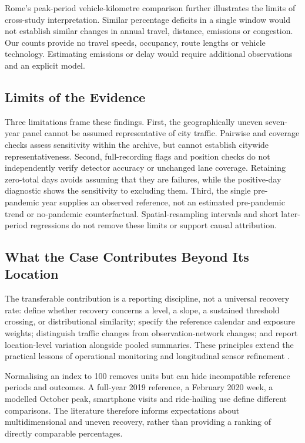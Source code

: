 \documentclass[]{interact}
\begin{document}
Rome's peak-period vehicle-kilometre comparison \cite{aletta2022} further illustrates the limits of cross-study interpretation. Similar percentage deficits in a single window would not establish similar changes in annual travel, distance, emissions or congestion. Our counts provide no travel speeds, occupancy, route lengths or vehicle technology. Estimating emissions or delay would require additional observations and an explicit model.

\subsection{Limits of the Evidence}
Three limitations frame these findings. First, the geographically uneven seven-year panel cannot be assumed representative of city traffic. Pairwise and coverage checks assess sensitivity within the archive, but cannot establish citywide representativeness. Second, full-recording flags and position checks do not independently verify detector accuracy or unchanged lane coverage. Retaining zero-total days avoids assuming that they are failures, while the positive-day diagnostic shows the sensitivity to excluding them. Third, the single pre-pandemic year supplies an observed reference, not an estimated pre-pandemic trend or no-pandemic counterfactual. Spatial-resampling intervals and short later-period regressions do not remove these limits or support causal attribution.

\subsection{What the Case Contributes Beyond Its Location}
The transferable contribution is a reporting discipline, not a universal recovery rate: define whether recovery concerns a level, a slope, a sustained threshold crossing, or distributional similarity; specify the reference calendar and exposure weights; distinguish traffic changes from observation-network changes; and report location-level variation alongside pooled summaries. These principles extend the practical lessons of operational monitoring \cite{dft,cambridge2024} and longitudinal sensor refinement \cite{glasgow2025}.

Normalising an index to 100 removes units but can hide incompatible reference periods and outcomes. A full-year 2019 reference, a February 2020 week, a modelled October peak, smartphone visits and ride-hailing use define different comparisons. The literature therefore informs expectations about multidimensional and uneven recovery, rather than providing a ranking of directly comparable percentages.
\end{document}

